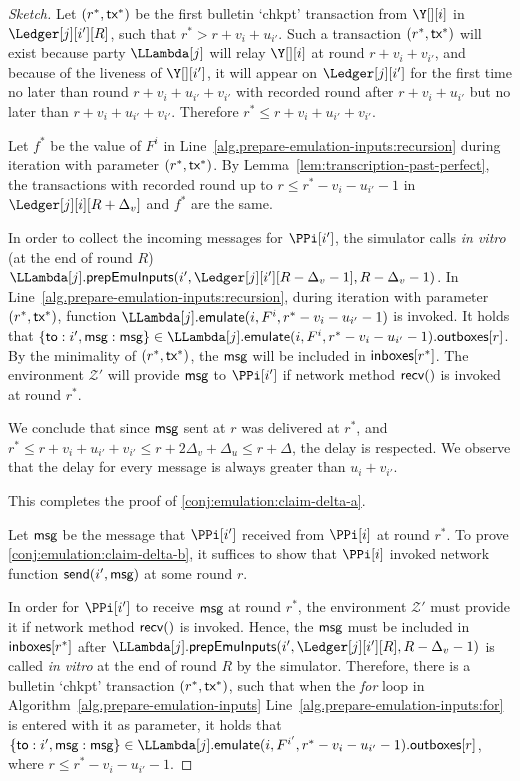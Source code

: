 \begin{proof}[Sketch]
  Let $(r^*, \textsf{tx}^*)$ be the first bulletin `chkpt' transaction from $\Y[][i]$ in $\Ledger[j][i'][R]$, such that
  $r^* > r + v_{i} + u_{i'}$.
  Such a transaction $(r^*, \textsf{tx}^*)$ will exist because party $\LLambda[j]$ will relay $\Y[][i]$
  at round $r + v_i + v_{i'}$, and
  because of the liveness of $\Y[][i']$, it will appear on $\Ledger[j][i']$ for the
  first time no later than round $r + v_i + u_{i'} + v_{i'}$ with recorded round
  after $r + v_i + u_{i'}$ but no later than $r + v_i + u_{i'} + v_{i'}$.
  Therefore $r^* \leq r + v_{i} + u_{i'} + v_{i'}$.

  Let $f^*$ be the value of $F^i$ in Line~\ref{alg.prepare-emulation-inputs:recursion}
  during iteration with parameter $(r^*, \textsf{tx}^*)$.
  By Lemma~\ref{lem:transcription-past-perfect}, the transactions with
  recorded round up to $r \leq r^* - v_i - u_{i'} - 1$ in $\Ledger[j][i][R + \Delta_v]$
  and $f^*$ are the same.

  In order to collect the incoming messages for $\PPi[i']$,
  the simulator calls \emph{in vitro} (at the end of round $R$)
  $\LLambda[j].\prepareEmulationInputs(i', \Ledger[j][i'][R - \Delta_v - 1], R - \Delta_v - 1)$.
  In Line~\ref{alg.prepare-emulation-inputs:recursion}, during iteration with parameter
  $(r^*, \textsf{tx}^*)$, function $\LLambda[j].\emulate(i, F^i, r^* - v_i - u_{i'} - 1)$ is invoked. It holds that
  $\{\textsf{to}: i', \msg: \msg\} \in \LLambda[j].\emulate(i, F^i, r^* - v_i - u_{i'} - 1).\outboxes[r]$.
  By the minimality of $(r^*, \textsf{tx}^*)$, the $\textsf{msg}$ will be included in $\textsf{inboxes}[r^*]$.
  The environment $\mathcal{Z}'$ will provide $\textsf{msg}$ to $\PPi[i']$
  if network method $\textsf{recv}()$ is invoked at round $r^*$.

  We conclude that since $\textsf{msg}$ sent at $r$ was delivered at $r^*$,
  and $r^* \leq r + v_{i} + u_{i'} + v_{i'} \leq r + 2 \Delta_v + \Delta_u \leq r + \Delta$, the
  delay is respected. We observe that the delay for every message is always
  greater than $u_i + v_{i'}$.

  This completes the proof of \ref{conj:emulation:claim-delta-a}.

  Let $\textsf{msg}$ be the message that $\PPi[i']$ received from $\PPi[i]$ at round $r^*$.
  To prove \ref{conj:emulation:claim-delta-b}, it suffices to show that
  $\PPi[i]$ invoked network function $\textsf{send}(i', \textsf{msg})$ at some round $r$.

  In order for $\PPi[i']$ to receive $\textsf{msg}$ at round $r^*$,
  the environment $\mathcal{Z}'$ must provide it if network method $\textsf{recv}()$ is invoked.
  Hence, the $\textsf{msg}$ must be included in $\textsf{inboxes}[r^*]$ after $\LLambda[j].\prepareEmulationInputs(i', \Ledger[j][i'][R], R - \Delta_v - 1)$
  is called \emph{in vitro} at the end of round $R$ by the simulator.
  Therefore, there is a bulletin `chkpt' transaction $(r^*, \textsf{tx}^*)$, such that
  when the \emph{for} loop in Algorithm~\ref{alg.prepare-emulation-inputs} Line~\ref{alg.prepare-emulation-inputs:for}
  is entered with it as parameter, it holds that
  $\{\textsf{to}: i', \msg: \msg\} \in \LLambda[j].\emulate(i, F^{i'}, r^* - v_i - u_{i'} - 1).\outboxes[r]$,
  where $r \leq r^* - v_i - u_{i'} - 1$.


\end{proof}
